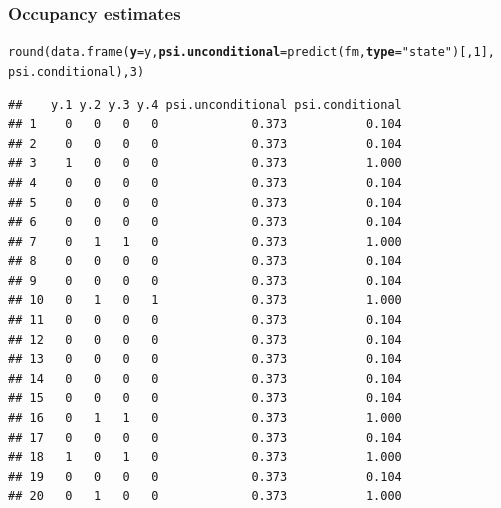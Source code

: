 \documentclass[color=usenames,dvipsnames]{beamer}\usepackage[]{graphicx}\usepackage[]{xcolor}
\makeatletter
\newcommand{\hlnum}[1]{\textcolor[rgb]{0.69,0.494,0}{#1}}%
\newcommand{\hlsng}[1]{\textcolor[rgb]{0.749,0.012,0.012}{#1}}%
\newcommand{\hldef}[1]{\textcolor[rgb]{0,0,0}{#1}}%
\newcommand{\hlkwc}[1]{\textcolor[rgb]{0,0,0}{\textbf{#1}}}%
\newcommand{\hlkwd}[1]{\textcolor[rgb]{0.004,0.004,0.506}{#1}}%
\newenvironment{kframe}{%
 \def\at@end@of@kframe{}%
 \ifinner\ifhmode%
  \def\at@end@of@kframe{\end{minipage}}%
  \begin{minipage}{\columnwidth}%
 \fi\fi%
 \def\FrameCommand##1{\hskip\@totalleftmargin \hskip-\fboxsep
 \colorbox{shadecolor}{##1}\hskip-\fboxsep
     \hskip-\linewidth \hskip-\@totalleftmargin \hskip\columnwidth}%
 \MakeFramed {\advance\hsize-\width
   \@totalleftmargin\z@ \linewidth\hsize
   \@setminipage}}%
 {\par\unskip\endMakeFramed%
 \at@end@of@kframe}
\newenvironment{knitrout}{}{} %
\makeatother
\begin{document}
\begin{frame}[fragile]
  \frametitle{Occupancy estimates}
\begin{knitrout}\scriptsize
{}\color{fgcolor}\begin{kframe}
\begin{alltt}
\hlkwd{round}\hldef{(}\hlkwd{data.frame}\hldef{(}\hlkwc{y}\hldef{=y,} \hlkwc{psi.unconditional}\hldef{=}\hlkwd{predict}\hldef{(fm,} \hlkwc{type}\hldef{=}\hlsng{"state"}\hldef{)[,}\hlnum{1}\hldef{],}
                 \hldef{psi.conditional),} \hlnum{3}\hldef{)}
\end{alltt}
\begin{verbatim}
##    y.1 y.2 y.3 y.4 psi.unconditional psi.conditional
## 1    0   0   0   0             0.373           0.104
## 2    0   0   0   0             0.373           0.104
## 3    1   0   0   0             0.373           1.000
## 4    0   0   0   0             0.373           0.104
## 5    0   0   0   0             0.373           0.104
## 6    0   0   0   0             0.373           0.104
## 7    0   1   1   0             0.373           1.000
## 8    0   0   0   0             0.373           0.104
## 9    0   0   0   0             0.373           0.104
## 10   0   1   0   1             0.373           1.000
## 11   0   0   0   0             0.373           0.104
## 12   0   0   0   0             0.373           0.104
## 13   0   0   0   0             0.373           0.104
## 14   0   0   0   0             0.373           0.104
## 15   0   0   0   0             0.373           0.104
## 16   0   1   1   0             0.373           1.000
## 17   0   0   0   0             0.373           0.104
## 18   1   0   1   0             0.373           1.000
## 19   0   0   0   0             0.373           0.104
## 20   0   1   0   0             0.373           1.000
\end{verbatim}
\end{kframe}
\end{knitrout}
\end{frame}
\end{document}
